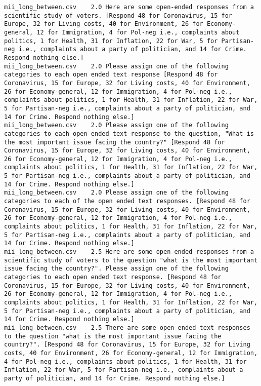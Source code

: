 \begin{lstlisting}
mii_long_between.csv	2.0	Here are some open-ended responses from a scientific study of voters. [Respond 48 for Coronavirus, 15 for Europe, 32 for Living costs, 40 for Environment, 26 for Economy-general, 12 for Immigration, 4 for Pol-neg i.e., complaints about politics, 1 for Health, 31 for Inflation, 22 for War, 5 for Partisan-neg i.e., complaints about a party of politician, and 14 for Crime. Respond nothing else.]
mii_long_between.csv	2.0	Please assign one of the following categories to each open ended text response [Respond 48 for Coronavirus, 15 for Europe, 32 for Living costs, 40 for Environment, 26 for Economy-general, 12 for Immigration, 4 for Pol-neg i.e., complaints about politics, 1 for Health, 31 for Inflation, 22 for War, 5 for Partisan-neg i.e., complaints about a party of politician, and 14 for Crime. Respond nothing else.]
mii_long_between.csv	2.0	Please assign one of the following categories to each open ended text response to the question, "What is the most important issue facing the country?" [Respond 48 for Coronavirus, 15 for Europe, 32 for Living costs, 40 for Environment, 26 for Economy-general, 12 for Immigration, 4 for Pol-neg i.e., complaints about politics, 1 for Health, 31 for Inflation, 22 for War, 5 for Partisan-neg i.e., complaints about a party of politician, and 14 for Crime. Respond nothing else.]
mii_long_between.csv	2.0	Please assign one of the following categories to each of the open ended text responses. [Respond 48 for Coronavirus, 15 for Europe, 32 for Living costs, 40 for Environment, 26 for Economy-general, 12 for Immigration, 4 for Pol-neg i.e., complaints about politics, 1 for Health, 31 for Inflation, 22 for War, 5 for Partisan-neg i.e., complaints about a party of politician, and 14 for Crime. Respond nothing else.]
mii_long_between.csv	2.5	Here are some open-ended responses from a scientific study of voters to the question "what is the most important issue facing the country?". Please assign one of the following categories to each open ended text response. [Respond 48 for Coronavirus, 15 for Europe, 32 for Living costs, 40 for Environment, 26 for Economy-general, 12 for Immigration, 4 for Pol-neg i.e., complaints about politics, 1 for Health, 31 for Inflation, 22 for War, 5 for Partisan-neg i.e., complaints about a party of politician, and 14 for Crime. Respond nothing else.]
mii_long_between.csv	2.5	There are some open-ended text responses to the question "what is the most important issue facing the country?". [Respond 48 for Coronavirus, 15 for Europe, 32 for Living costs, 40 for Environment, 26 for Economy-general, 12 for Immigration, 4 for Pol-neg i.e., complaints about politics, 1 for Health, 31 for Inflation, 22 for War, 5 for Partisan-neg i.e., complaints about a party of politician, and 14 for Crime. Respond nothing else.]

\end{lstlisting}
